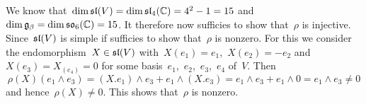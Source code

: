 We know that~$\dim \mathfrak{sl}(V) = \dim \mathfrak{sl}_4(\mathbb{C}) = 4^2 - 1 = 15$ and~$\dim \mathfrak{g}_\beta = \dim \mathfrak{so}_6(\mathbb{C}) = 15$.
It therefore now sufficies to show that~$\rho$ is injective.
Since~$\mathfrak{sl}(V)$ is simple if sufficies to show that~$\rho$ is nonzero.
For this we consider the endomorphism~$X \in \mathfrak{sl}(V)$ with~$X(e_1) = e_1$,~$X(e_2) = -e_2$ and~$X(e_3) = X_(e_4) = 0$ for some basis~$e_1$,~$e_2$,~$e_3$,~$e_4$ of~$V$.
Then
\[
  \rho(X)(e_1 \wedge e_3)
  =
  (X.e_1) \wedge e_3 + e_1 \wedge (X.e_3)
  =
  e_1 \wedge e_3 + e_1 \wedge 0
  =
  e_1 \wedge e_3
  \neq
  0
\]
and hence~$\rho(X) \neq 0$.
This shows that~$\rho$ is nonzero.










